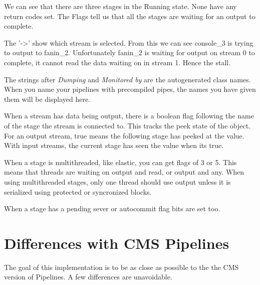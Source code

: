We can see that there are three stages in the Running state.  None
have any return codes set.  The Flags tell us that all the stages are
waiting for an output to complete.

The '->' show which stream is
selected.  From this we can see console\_3 is trying to output to
fanin\_2. Unfortunately fanin\_2 is waiting for output on stream 0 to
complete, it cannot read the data waiting on in stream 1.  Hence the
stall.

The strings after \emph{Dumping} and \emph{Monitored by} are the
autogenerated class names. When you name your pipelines with
precompiled pipes, the names you have given them will be displayed here.

When a stream has data being output, there is a boolean flag following the name of the stage the stream is connected to. This tracks the peek state of the object.  For an output stream, true means the following stage has peeked at the value. With input streams, the current stage has seen the value when its true.

When a stage is multithreaded, like elastic, you can get flags of 3 or 5. This means that threads are waiting on output and read, or output and any. When using multithreaded stages, only one thread should use output unless it is serialized using protected or syncronized blocks.

When a stage has a pending sever or autocommit flag bits are set too.


\chapter{Differences with CMS Pipelines}
The goal of this implementation is to be as close as possible to the
the CMS version of Pipelines. A few differences are unavoidable.

